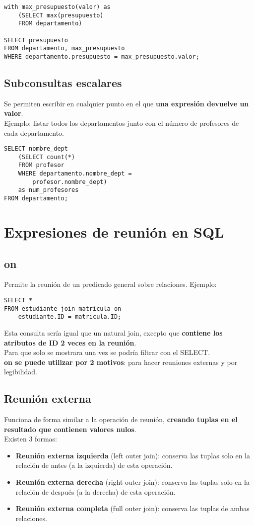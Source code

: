 \documentclass{article}
\begin{document}
\begin{verbatim}
with max_presupuesto(valor) as
    (SELECT max(presupuesto)
    FROM departamento)
    
SELECT presupuesto
FROM departamento, max_presupuesto
WHERE departamento.presupuesto = max_presupuesto.valor;
\end{verbatim}

\subsection{Subconsultas escalares}
Se permiten escribir en cualquier punto en el que \textbf{una expresión devuelve un valor}. \\
Ejemplo: listar todos los departamentos junto con el número de profesores de cada departamento.

\begin{verbatim}
SELECT nombre_dept
    (SELECT count(*)
    FROM profesor
    WHERE departamento.nombre_dept =
        profesor.nombre_dept)
    as num_profesores
FROM departamento;
\end{verbatim}

\section{Expresiones de reunión en SQL}
\subsection{on}
Permite la reunión de un predicado general sobre relaciones.
Ejemplo:
\begin{verbatim}
SELECT *
FROM estudiante join matricula on 
    estudiante.ID = matricula.ID;
\end{verbatim}
Esta consulta sería igual que un natural join, excepto que \textbf{contiene los atributos de ID 2 veces en la reunión}. \\
Para que solo se mostrara una vez se podría filtrar con el SELECT. \\
\textbf{on se puede utilizar por 2 motivos}: para hacer reuniones externas y por legibilidad. 

\newpage

\subsection{Reunión externa}
Funciona de forma similar a la operación de reunión, \textbf{creando tuplas en el resultado que contienen valores nulos}. \\
Existen 3 formas:
\begin{itemize}
    \item \textbf{Reunión externa izquierda} (left outer join): conserva las tuplas solo en la relación de antes (a la izquierda) de esta operación.

    \item \textbf{Reunión externa derecha} (right outer join): conserva las tuplas solo en la relación de después (a la derecha) de esta operación.

    \item \textbf{Reunión externa completa} (full outer join): conserva las tuplas de ambas relaciones. 
\end{itemize}
\end{document}
